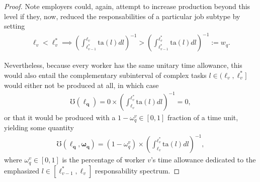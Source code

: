 \documentclass[hidelinks, nonatbib]{elsarticle}
\begin{document}
\begin{lemma}
\begin{proof}
        Note employers could, again, attempt to increase production beyond this level if they, now, reduced the responsabilities of a particular job subtype by setting
        \begin{align}
        \ell_v < \ell_{v}^{*}
        \implies
            \left(
                \int_{
                    \ell_{v-1}^{*}
                }^{
                    \ell_{v}
                }
                \text{ta}(l)dl
            \right) ^ {-1}
            >
            \left(
                \int_{
                    \ell_{v-1}^{*}
                }^{
                    \ell_{v}^{*}
                }
                \text{ta}(l)dl
            \right) ^ {-1}
            :=
            w_q
            .
        \end{align}
        
        Nevertheless, because every worker has the same unitary time allowance, this would also entail the complementary subinterval of complex tasks $l \in (\ell_{v}, \ell_{v}^{*}]$ would either not be produced at all, in which case
        \begin{align}
            \mho(\boldsymbol{\ell_{q}})
            =
            0
            \times
            \left(
                \int_{
                    \ell_{v}
                }^{
                    \ell_{v}^{*}
                }
                \text{ta}(l)dl
            \right) ^ {-1}
            =
            0
            ,
        \end{align}
        or that it would be produced with a $1 - \omega_{q}^{v} \in [0,1]$ fraction of a time unit, yielding some quantity
        \begin{align}
            \mho(
                \boldsymbol{\ell_{q}}
                ,\boldsymbol{\omega_{q}}
            )
            =
            (1 - \omega_{q}^{v})
            \times
            \left(
                \int_{
                    \ell_{v}
                }^{
                    \ell_{v}^{*}
                }
                \text{ta}(l)dl
            \right) ^ {-1}
            ,
        \end{align}
        where $\omega_{q}^{v} \in [0,1]$ is the percentage of worker $v$'s time allowance dedicated to the emphasized $l \in [\ell_{v-1}^{*}, \ell_{v}]$ responsability spectrum.
        

\end{proof}
\end{lemma}
\end{document}
